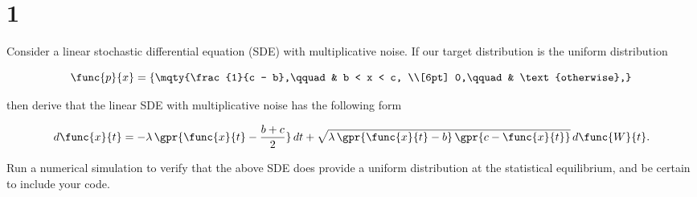 \section{1}

Consider a linear stochastic differential equation (SDE) with multiplicative noise. If our target distribution is the uniform distribution

\begin{equation}
	\func{p}{x} = \left\lbrace \mqty{\frac{1}{c - b},\qquad & b < x < c, \\[6pt]
	                                 0,\qquad               & \text{otherwise},} \right.
\end{equation}

then derive that the linear SDE with multiplicative noise has the following form

\begin{equation}
	d\func{x}{t} = -\lambda\,\gpr{\func{x}{t} - \frac{b + c}{2}}\,dt + \sqrt{\lambda\,\gpr{\func{x}{t} - b}\,\gpr{c - \func{x}{t}}}\,d\func{W}{t}.
\end{equation}

Run a numerical simulation to verify that the above SDE does provide a uniform distribution at the statistical equilibrium, and be certain to include your code.

